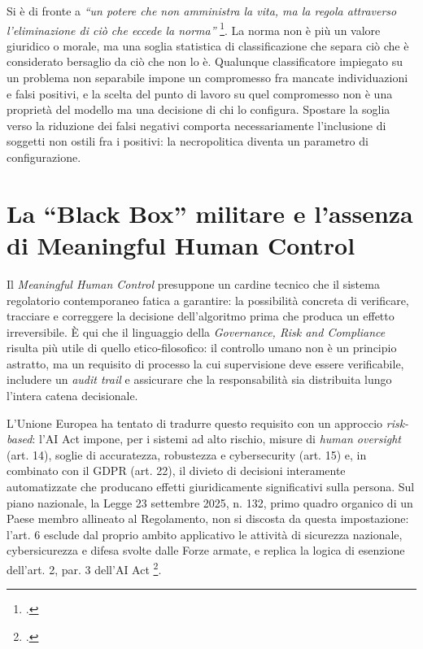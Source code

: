 \documentclass[a4paper,12pt]{report}
\begin{document}
Si è di fronte a \textit{``un potere che non amministra la vita, ma la regola
attraverso l'eliminazione di ciò che eccede la norma''} \footcite{buffa_2025}. La
norma non è più un valore giuridico o morale, ma una soglia statistica di
classificazione che separa ciò che è considerato bersaglio da ciò che non lo è.
Qualunque classificatore impiegato su un problema non separabile impone un
compromesso fra mancate individuazioni e falsi positivi, e la scelta del punto
di lavoro su quel compromesso non è una proprietà del modello ma una decisione di
chi lo configura. Spostare la soglia verso la riduzione dei falsi negativi
comporta necessariamente l'inclusione di soggetti non ostili fra i positivi: la
necropolitica diventa un parametro di configurazione.

\section{La ``Black Box'' militare e l'assenza di Meaningful Human Control}

Il \textit{Meaningful Human Control} presuppone un cardine tecnico che il sistema
regolatorio contemporaneo fatica a garantire: la possibilità concreta di
verificare, tracciare e correggere la decisione dell'algoritmo prima che produca
un effetto irreversibile. È qui che il linguaggio della \textit{Governance, Risk
and Compliance} risulta più utile di quello etico-filosofico: il controllo umano
non è un principio astratto, ma un requisito di processo la cui supervisione deve
essere verificabile, includere un \textit{audit trail} e assicurare che la
responsabilità sia distribuita lungo l'intera catena decisionale.

L'Unione Europea ha tentato di tradurre questo requisito con un approccio
\textit{risk-based}: l'AI Act impone, per i sistemi ad alto rischio, misure di
\textit{human oversight} (art. 14), soglie di accuratezza, robustezza e
cybersecurity (art. 15) e, in combinato con il GDPR (art. 22), il divieto di
decisioni interamente automatizzate che producano effetti giuridicamente
significativi sulla persona. Sul piano nazionale, la Legge 23 settembre 2025, n.
132, primo quadro organico di un Paese membro allineato al Regolamento, non si
discosta da questa impostazione: l'art. 6 esclude dal proprio ambito applicativo
le attività di sicurezza nazionale, cybersicurezza e difesa svolte dalle Forze
armate, e replica la logica di esenzione dell'art. 2, par. 3 dell'AI Act
\footcite{legge_132_2025}.
\end{document}
